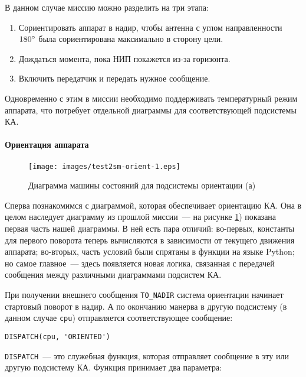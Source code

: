 \documentclass[12pt,a4paper]{article}
\begin{document}
В данном случае миссию можно разделить на три этапа:

\begin{enumerate}
\item Сориентировать аппарат в надир, чтобы антенна с углом направленности
  $180\degree$ была сориентирована максимально в сторону цели.
\item Дождаться момента, пока НИП покажется из-за горизонта.
\item Включить передатчик и передать нужное сообщение.
\end{enumerate}

Одновременно с этим в миссии необходимо поддерживать температурный режим аппарата, что
потребует отдельной диаграммы для соответствующей подсистемы КА.

\paragraph{Ориентация аппарата}

\begin{figure}[tbh]
  \begin{center}
    \texttt{[image: images/test2sm-orient-1.eps]}
    \caption{Диаграмма машины состояний для подсистемы ориентации (а)}
    \label{Pic:Test2SM-Orient-1}
  \end{center}
\end{figure}

Сперва познакомимся с диаграммой, которая обеспечивает ориентацию КА. Она в целом
наследует диаграмму из прошлой миссии~--- на рисунке \ref{Pic:Test2SM-Orient-1}) показана
первая часть нашей диаграммы. В ней есть пара отличий: во-первых, константы для первого
поворота теперь вычисляются в зависимости от текущего движения аппарата; во-вторых, часть
условий были спрятаны в функции на языке Python; но самое главное~--- здесь появляется
новая логика, связанная с передачей сообщения между различными диаграммами подсистем КА.

При получении внешнего сообщения \verb'TO_NADIR' система ориентации начинает стартовый
поворот в надир. А по окончанию манерва в другую подсистему (в данном случае \verb'cpu')
отправляется соответствующее сообщение:

\begin{center}
\begin{verbatim}
DISPATCH(cpu, 'ORIENTED')
\end{verbatim}
\end{center}

\verb'DISPATCH'~--- это служебная функция, которая отправляет сообщение в эту или другую
подсистему КА. Функция принимает два параметра:
\end{document}

